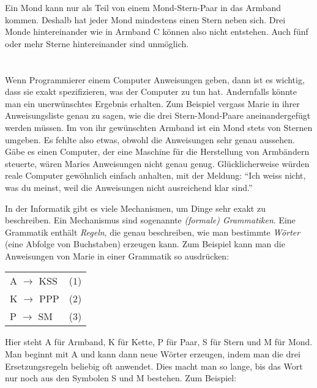 {{Ein Mond kann nur als Teil von einem Mond-Stern-Paar in das Armband kommen. Deshalb hat jeder Mond mindestens einen Stern neben sich. Drei Monde hintereinander wie in Armband C können also nicht entstehen. Auch fünf oder mehr Sterne hintereinander sind unmöglich.

{\centering%
\par}



\section*{\BrochureItsInformatics}
Wenn Programmierer einem Computer Anweisungen geben, dann ist es wichtig, dass sie exakt spezifizieren, was der Computer zu tun hat. Andernfalls könnte man ein unerwünschtes Ergebnis erhalten. Zum Beispiel vergass Marie in ihrer Anweisungsliste genau zu sagen, wie die drei Stern-Mond-Paare aneinandergefügt werden müssen. Im von ihr gewünschten Armband ist ein Mond stets von Sternen umgeben. Es fehlte also etwas, obwohl die Anweisungen sehr genau aussehen. Gäbe es einen Computer, der eine Maschine für die Herstellung von Armbändern steuerte, wären Maries Anweisungen nicht genau genug. Glücklicherweise würden reale Computer gewöhnlich einfach anhalten, mit der Meldung: “Ich weiss nicht, was du meinst, weil die Anweisungen nicht ausreichend klar sind.”

In der Informatik gibt es viele Mechanismen, um Dinge sehr exakt zu beschreiben. Ein Mechanismus sind sogenannte \emph{(formale) Grammatiken}. Eine Grammatik enthält \emph{Regeln}, die genau beschreiben, wie man bestimmte \emph{Wörter} (eine Abfolge von Buchstaben) erzeugen kann. Zum Beispiel kann man die Anweisungen von Marie in einer Grammatik so ausdrücken:

\begin{adjustwidth}{1.5em}{0em}
\begin{tabular}{ @{} l l @{} }
  A \ensuremath{\rightarrow} KSS & ($1$) \\ 
  K \ensuremath{\rightarrow} PPP & ($2$) \\ 
  P \ensuremath{\rightarrow} SM & ($3$)
\end{tabular}


\end{adjustwidth}

Hier steht A für Armband, K für Kette, P für Paar, S für Stern und M für Mond. Man beginnt mit A und kann dann neue Wörter erzeugen, indem man die drei Ersetzungsregeln beliebig oft anwendet. Dies macht man so lange, bis das Wort nur noch aus den Symbolen S und M bestehen. Zum Beispiel:

}}
